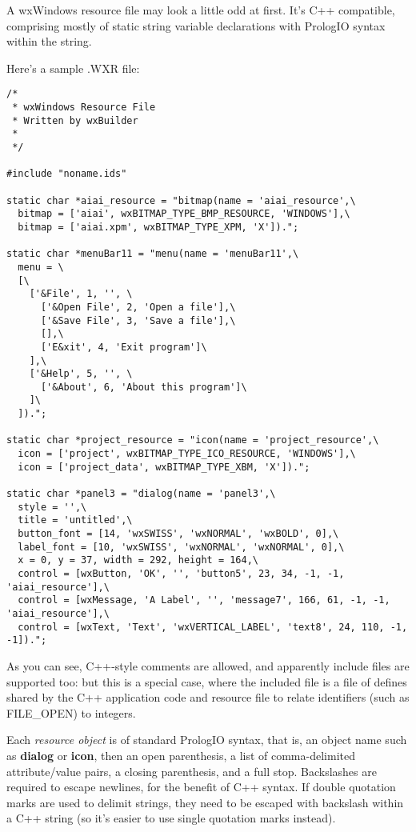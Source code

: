 A wxWindows resource file may look a little odd at first. It's C++
compatible, comprising mostly of static string variable declarations with
PrologIO syntax within the string.

Here's a sample .WXR file:

\begin{verbatim}
/*
 * wxWindows Resource File
 * Written by wxBuilder
 *
 */

#include "noname.ids"

static char *aiai_resource = "bitmap(name = 'aiai_resource',\
  bitmap = ['aiai', wxBITMAP_TYPE_BMP_RESOURCE, 'WINDOWS'],\
  bitmap = ['aiai.xpm', wxBITMAP_TYPE_XPM, 'X']).";

static char *menuBar11 = "menu(name = 'menuBar11',\
  menu = \
  [\
    ['&File', 1, '', \
      ['&Open File', 2, 'Open a file'],\
      ['&Save File', 3, 'Save a file'],\
      [],\
      ['E&xit', 4, 'Exit program']\
    ],\
    ['&Help', 5, '', \
      ['&About', 6, 'About this program']\
    ]\
  ]).";

static char *project_resource = "icon(name = 'project_resource',\
  icon = ['project', wxBITMAP_TYPE_ICO_RESOURCE, 'WINDOWS'],\
  icon = ['project_data', wxBITMAP_TYPE_XBM, 'X']).";

static char *panel3 = "dialog(name = 'panel3',\
  style = '',\
  title = 'untitled',\
  button_font = [14, 'wxSWISS', 'wxNORMAL', 'wxBOLD', 0],\
  label_font = [10, 'wxSWISS', 'wxNORMAL', 'wxNORMAL', 0],\
  x = 0, y = 37, width = 292, height = 164,\
  control = [wxButton, 'OK', '', 'button5', 23, 34, -1, -1, 'aiai_resource'],\
  control = [wxMessage, 'A Label', '', 'message7', 166, 61, -1, -1, 'aiai_resource'],\
  control = [wxText, 'Text', 'wxVERTICAL_LABEL', 'text8', 24, 110, -1, -1]).";
\end{verbatim}

As you can see, C++-style comments are allowed, and apparently include files
are supported too: but this is a special case, where the included file
is a file of defines shared by the C++ application code and resource file
to relate identifiers (such as FILE\_OPEN) to integers.

Each {\it resource object} is of standard PrologIO syntax, that is,
an object name such as {\bf dialog} or {\bf icon}, then an open
parenthesis, a list of comma-delimited attribute/value pairs, a closing
parenthesis, and a full stop. Backslashes are required to escape newlines,
for the benefit of C++ syntax. If double quotation marks are used to
delimit strings, they need to be escaped with backslash within a C++ string
(so it's easier to use single quotation marks instead).

